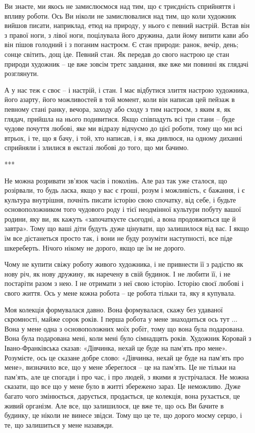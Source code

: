 Ви знаєте, ми якось не
замислюємося над тим, що є триєдність сприйняття і впливу роботи. Ось Ви ніколи
не замислювалися над тим, що коли художник вийшов писати, наприклад, етюд на
природу, у нього є певний настрій. Встав він з правої ноги, з лівої ноги,
поцілувала його дружина, дали йому випити кави або він пішов голодний і з
поганим настроєм. Є стан природи: ранок, вечір, день; сонце світить, дощ іде.
Певний стан. Як передав до свого настрою це стан природи художник – це вже
зовсім третє завдання, яке вже ми повинні як глядачі розглянути. 

А у нас теж є
своє – і настрій, і стан. І має відбутися злиття настрою художника, його
азарту, його можливостей в той момент, коли він написав цей пейзаж в певному
стані ранку, вечора, заходу або сходу з тим настроєм, з яким я, як глядач,
прийшла на нього подивитися. Якщо співпадуть всі три стани – буде чудове
почуття любові, яке ми відразу відчуємо до цієї роботи, тому що ми всі втрьох,
і те, що я бачу, і той, хто написав, і я, яка дивлюся, на одному диханні
сприйняли і злилися в екстазі любові до того, що ми бачимо.

***

Не можна розривати зв'язок часів і поколінь. Але раз так уже сталося, що
розірвали, то будь ласка, якщо у вас є гроші, розум і можливість, є бажання, і
є культура внутрішня, почніть писати історію свою спочатку, від себе, і будьте
основоположником того чудового роду і тієї неодмінної культури побуту вашої
родини, яку ви, як кажуть «започаткуєте сьогодні, а вона продовжиться ще й
завтра». Тому що ваші діти будуть дуже цінувати, що залишилося від вас. І якщо
їм все дістанеться просто так, і вони не буду розуміти наступності, все піде
шкереберть. Нічого нікому не дорого, якщо це їм не дорого.

Чому не купити свіжу роботу живого художника, і не привнести її з радістю як
нову річ, як нову дружину, як наречену в свій будинок. І не любити її, і не
постаріти разом з нею. І не отримати з неї свою історію. Історію своєї любові і
свого життя. Ось у мене кожна робота – це робота тільки та, яку я купувала. 

Моя колекція формувалася давно. Вона формувалася, скажу без удаваної
скромності, майже сорок років. І перша робота у мене знаходиться ось тут ...
Вона у мене одна з основоположних моїх робіт, тому що вона була подарована.
Вона була подарована мені, коли мені було сімнадцять років. Художник Коровай з
Івано-Франківська сказав: «Дівчинка, нехай це буде на пам'ять про мене».
Розумієте, ось це сказане добре слово: «Дівчинка, нехай це буде на пам'ять про
мене», визначило все, що у мене збереглося – це на пам'ять. Це не тільки на
пам'ять, але це спогади і про час, і про людей, з якими я зустрічалася. Не
можна сказати, що все що у мене було в житті збережено зараз. Це неможливо.
Дуже багато чого змінюється, дарується, продається, це колекція, вона
рухається, це живий організм. Але все, що залишилося, це вже те, що ось Ви
бачите в будинку, це ніколи не винесе звідси. Тому що це те, що дорого моєму
серцю, і те, що залишиться у мене назавжди.

